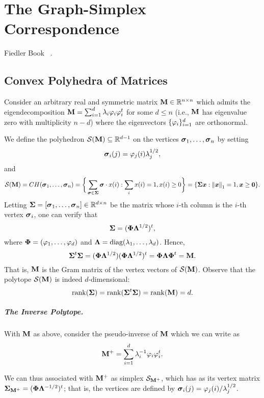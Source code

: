 \chapter{The Graph-Simplex Correspondence}

Fiedler Book ~\cite{fiedler2011matrices}. 

\section{Convex Polyhedra of Matrices}
Consider an arbitrary real and symmetric matrix $\vb{M}\in \mathbb{R}^{n\times n}$ which admits the eigendecomposition $\vb{M}=\sum_{i=1}^d \lambda_i \varphi_i\varphi_i^t$ for some $d\leq n$ (i.e., $\vb{M}$ has eigenvalue zero with multiplicity $n-d$) where the eigenvectors $\{\varphi_i\}_{i=1}^d $ are orthonormal. 

We define the polyhedron $\mathcal{S}({\vb{M}})\subseteq \mathbb{R}^{d-1}$ on the vertices $\vb*{\sigma}_1,\dots,\vb*{\sigma}_n$ by setting
\begin{equation*}
    \vb*{\sigma}_i(j) = \varphi_j(i)\lambda_j^{1/2},
\end{equation*}
and 
\begin{equation*}
    \mathcal{S}(\vb{M})=CH(\vb*{\sigma}_1,\dots,\vb*{\sigma}_n)=\bigg\{\sum_{\vb*{\sigma}\in \boldsymbol{\Sigma}} \vb*{\sigma}\cdot x(i): \sum_i x(i) =1, x(i)\geq 0\bigg\} = \{\boldsymbol{\Sigma}\vb*{x}: \norm{\vb*{x}}_1=1, \vb*{x}\geq \vb{0}\}. 
\end{equation*}
Letting $\boldsymbol{\Sigma}=[\vb*{\sigma}_1,\dots,\vb*{\sigma}_n]\in \mathbb{R}^{d\times n}$ be the matrix whose $i$-th column is the $i$-th vertex $\vb*{\sigma}_i$, one can verify that 
\begin{equation*}
    \boldsymbol{\Sigma}=(\boldsymbol{\Phi} \vb{\Lambda}^{1/2})^t,
\end{equation*}
where $\boldsymbol{\Phi}=(\varphi_1,\dots,\varphi_d)$ and $\vb{\Lambda}=\text{diag}(\lambda_1,\dots,\lambda_d)$. Hence, 
\begin{equation*}
    \boldsymbol{\Sigma}^t \boldsymbol{\Sigma}=(\boldsymbol{\Phi}\vb{\Lambda}^{1/2}) (\boldsymbol{\Phi}\vb{\Lambda}^{1/2})^t = \boldsymbol{\Phi} \vb{\Lambda}\boldsymbol{\Phi}^t =\vb{M}.
\end{equation*}
That is, $\vb{M}$ is the Gram matrix of the vertex vectors of $\mathcal{S}(\vb{M})$. 
Observe that the polytope $\mathcal{S}(\vb{M})$ is indeed $d$-dimensional: 
\[\rank(\boldsymbol{\Sigma})=\rank(\boldsymbol{\Sigma}^t \boldsymbol{\Sigma})=\rank(\vb{M})=d.\]


\paragraph{The Inverse Polytope.}
With $\vb{M}$ as above, consider the pseudo-inverse of $\vb{M}$ which we can write as 
\[\vb{M}^+=\sum_{i=1}^d \lambda_i^{-1} \varphi_i\varphi_i^t.\]


We can thus associated with $\vb{M}^+$ as simplex $\mathcal{S}_{\vb{M}^+}$, which has as its vertex matrix $\boldsymbol{\Sigma}_{\vb{M}^+}=(\boldsymbol{\Phi}\vb{\Lambda}^{-1/2})^t$; that is, the vertices are defined by $\vb*{\sigma}_i(j)=\varphi_j(i)/\lambda_j^{1/2}$. 

